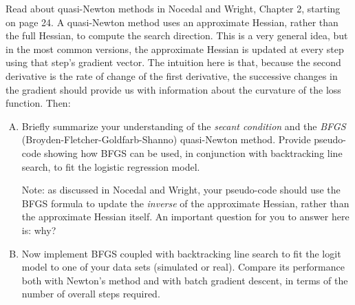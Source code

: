 \documentclass{mynotes}
\begin{document}
Read about quasi-Newton methods in Nocedal and Wright, Chapter 2, starting on page 24.  A quasi-Newton method uses an approximate Hessian, rather than the full Hessian, to compute the search direction.   This is a very general idea, but in the most common versions, the approximate Hessian is updated at every step using that step's gradient vector.  The intuition here is that, because the second derivative is the rate of change of the first derivative, the successive changes in the gradient should provide us with information about the curvature of the loss function.  Then:

\begin{enumerate}[(A)]
\item Briefly summarize your understanding of the \textit{secant condition} and the \textit{BFGS} (Broyden-Fletcher-Goldfarb-Shanno) quasi-Newton method.  Provide pseudo-code showing how BFGS can be used, in conjunction with backtracking line search, to fit the logistic regression model.

Note: as discussed in Nocedal and Wright, your pseudo-code should use the BFGS formula to update the \textit{inverse} of the approximate Hessian, rather than the approximate Hessian itself.  An important question for you to answer here is: why?
\item Now implement BFGS coupled with backtracking line search to fit the logit model to one of your data sets (simulated or real).  Compare its performance both with Newton's method and with batch gradient descent, in terms of the number of overall steps required.
\end{enumerate}
\end{document}
